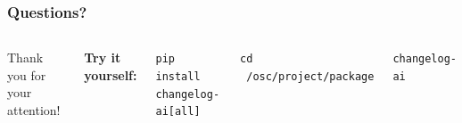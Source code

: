 \begin{frame}
\frametitle{Questions?}
\begin{columns}
Thank you for your attention!

\vspace{1cm}
\textbf{Try it yourself:}

\texttt{pip install changelog-ai[all]}

\texttt{cd ~/osc/project/package}

\texttt{changelog-ai}
\end{columns}
\end{frame}

